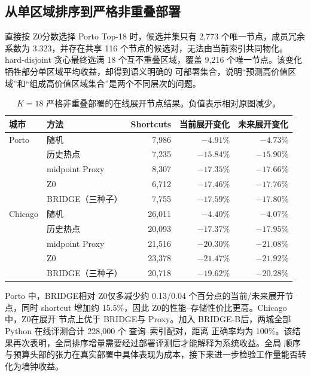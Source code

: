 \documentclass[UTF8,a4paper,10pt,twocolumn]{ctexart}
\newenvironment{paperwidetable}{\begin{table}[t]}{\end{table}}
\newenvironment{paperwidetable}{\begin{table}[H]}{\end{table}}
\newcommand{\zmethod}{Z0}
\newcommand{\gmethod}{BRIDGE}
\newcommand{\bmethod}{BRIDGE-B}
\begin{document}
\subsection{从单区域排序到严格非重叠部署}

直接按 \zmethod 分数选择 Porto Top-18 时，候选并集只有 2,773 个唯一节点，成员冗余系数为
3.323，并存在共享 116 个节点的候选对，无法由当前索引共同物化。hard-disjoint 贪心最终选满
18 个互不重叠区域，覆盖 9,216 个唯一节点。该变化牺牲部分单区域平均收益，却得到语义明确的
可部署集合，说明“预测高价值区域”和“组成高价值区域集合”是两个不同层次的问题。

\begin{paperwidetable}
  \centering
  \footnotesize
  \caption{$K=18$ 严格非重叠部署的在线展开节点结果。负值表示相对原图减少。}
  \label{tab:online}
  \begin{tabular}{llrrr}
    \toprule
    城市 & 方法 & Shortcuts & 当前展开变化 & 未来展开变化 \\
    \midrule
    Porto & 随机 & 7,986 & $-4.91\%$ & $-4.73\%$ \\
           & 历史热点 & 7,235 & $-15.84\%$ & $-15.90\%$ \\
           & midpoint Proxy & 8,307 & $-17.35\%$ & $-17.66\%$ \\
           & \zmethod & 6,712 & $-17.46\%$ & $-17.76\%$ \\
           & \gmethod（三种子） & 7,755 & $-17.59\%$ & $-17.80\%$ \\
    \midrule
    Chicago & 随机 & 26,011 & $-4.40\%$ & $-4.07\%$ \\
            & 历史热点 & 20,093 & $-17.37\%$ & $-17.95\%$ \\
            & midpoint Proxy & 21,516 & $-20.30\%$ & $-21.08\%$ \\
            & \zmethod & 23,378 & $-21.47\%$ & $-21.92\%$ \\
            & \gmethod（三种子） & 20,718 & $-19.62\%$ & $-20.28\%$ \\
    \bottomrule
  \end{tabular}
\end{paperwidetable}

Porto 中，\gmethod 相对 \zmethod 仅多减少约 0.13/0.04 个百分点的当前/未来展开节点，同时
shortcut 增加约 15.5\%，因此 \zmethod 的性能--存储性价比更高。Chicago 中，\zmethod 在展开
节点上优于 \gmethod 与 Proxy。加入 \bmethod 后，两城全部 Python 在线评测合计 228,000 个
查询--索引配对，距离
正确率均为 100\%。该结果再次表明，全局排序增量需要经过部署评测后才能解释为系统收益。全局
顺序与预算头部的张力在真实部署中具体表现为成本，接下来进一步检验工作量能否转化为墙钟收益。
\end{document}
